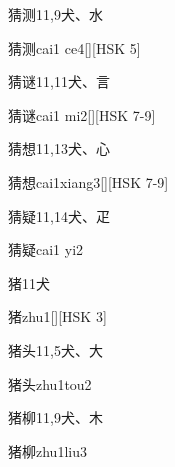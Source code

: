 \begin{Entry}{猜测}{11,9}{⽝、⽔}
  \begin{Phonetics}{猜测}{cai1 ce4}[][HSK 5]
  \end{Phonetics}
\end{Entry}

\begin{Entry}{猜谜}{11,11}{⽝、⾔}
  \begin{Phonetics}{猜谜}{cai1 mi2}[][HSK 7-9]
  \end{Phonetics}
\end{Entry}

\begin{Entry}{猜想}{11,13}{⽝、⼼}
  \begin{Phonetics}{猜想}{cai1xiang3}[][HSK 7-9]
  \end{Phonetics}
\end{Entry}

\begin{Entry}{猜疑}{11,14}{⽝、⽦}
  \begin{Phonetics}{猜疑}{cai1 yi2}
  \end{Phonetics}
\end{Entry}

\begin{Entry}{猪}{11}{⽝}
  \begin{Phonetics}{猪}{zhu1}[][HSK 3]
  \end{Phonetics}
\end{Entry}

\begin{Entry}{猪头}{11,5}{⽝、⼤}
  \begin{Phonetics}{猪头}{zhu1tou2}
  \end{Phonetics}
\end{Entry}

\begin{Entry}{猪柳}{11,9}{⽝、⽊}
  \begin{Phonetics}{猪柳}{zhu1liu3}
  \end{Phonetics}
\end{Entry}

